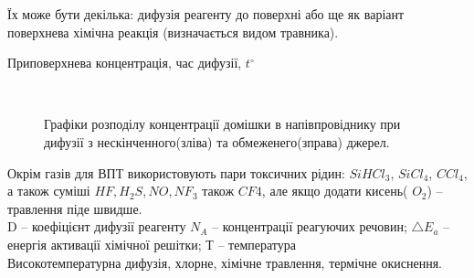 \documentclass[14pt,a4paper]{scrartcl}
\begin{document}
Їх може бути декілька: дифузія реагенту до поверхні або ще як варіант поверхнева хімічна реакція (визначається видом травника).\par
{}
Приповерхнева концентрація, час дифузії, $t^{\circ}$
\newpage
{}
\begin{figure}[h!]
\\
\caption{Графіки розподілу концентрації домішки в напівпровіднику при дифузії з нескінченного(зліва) та обмеженего(зправа) джерел.}
\end{figure}

Окрім газів для ВПТ використовують пари токсичних рідин: $SiHCl_3$, $SiCl_4$, $CCl_4$, а також
суміші $HF, H_2S, NO, NF_3$ також $CF4$, але якщо додати кисень( $O_2$) –травлення піде швидше.\\
D – коефіцієнт дифузії реагенту $N_A$ – концентрації реагуючих речовин; $\triangle E_a$ --енергія
активації хімічної решітки; Т – температура\\
Високотемпературна дифузія, хлорне, хімічне травлення, термічне окиснення. 






\end{document}
